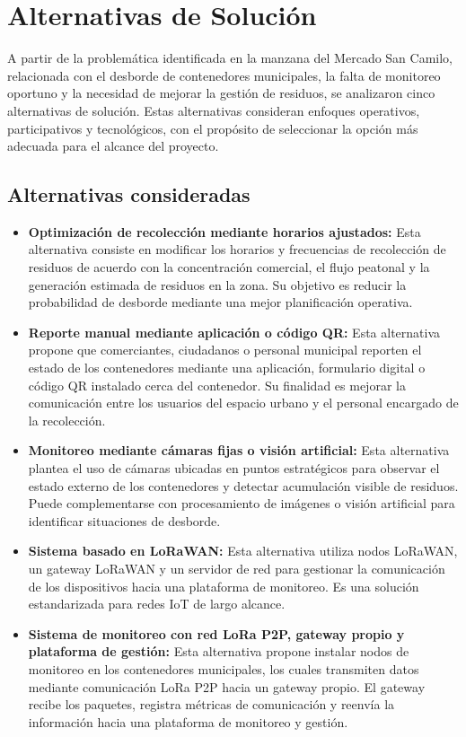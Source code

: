 \section{Alternativas de Solución}

A partir de la problemática identificada en la manzana del Mercado San Camilo, relacionada con el desborde de contenedores municipales, la falta de monitoreo oportuno y la necesidad de mejorar la gestión de residuos, se analizaron cinco alternativas de solución. Estas alternativas consideran enfoques operativos, participativos y tecnológicos, con el propósito de seleccionar la opción más adecuada para el alcance del proyecto.

\subsection{Alternativas consideradas}

\begin{itemize}
    \item \textbf{Optimización de recolección mediante horarios ajustados:} Esta alternativa consiste en modificar los horarios y frecuencias de recolección de residuos de acuerdo con la concentración comercial, el flujo peatonal y la generación estimada de residuos en la zona. Su objetivo es reducir la probabilidad de desborde mediante una mejor planificación operativa.
    
    \item \textbf{Reporte manual mediante aplicación o código QR:} Esta alternativa propone que comerciantes, ciudadanos o personal municipal reporten el estado de los contenedores mediante una aplicación, formulario digital o código QR instalado cerca del contenedor. Su finalidad es mejorar la comunicación entre los usuarios del espacio urbano y el personal encargado de la recolección.
    
    \item \textbf{Monitoreo mediante cámaras fijas o visión artificial:} Esta alternativa plantea el uso de cámaras ubicadas en puntos estratégicos para observar el estado externo de los contenedores y detectar acumulación visible de residuos. Puede complementarse con procesamiento de imágenes o visión artificial para identificar situaciones de desborde.
    
    \item \textbf{Sistema basado en LoRaWAN:} Esta alternativa utiliza nodos LoRaWAN, un gateway LoRaWAN y un servidor de red para gestionar la comunicación de los dispositivos hacia una plataforma de monitoreo. Es una solución estandarizada para redes IoT de largo alcance.
    
    \item \textbf{Sistema de monitoreo con red LoRa P2P, gateway propio y plataforma de gestión:} Esta alternativa propone instalar nodos de monitoreo en los contenedores municipales, los cuales transmiten datos mediante comunicación LoRa P2P hacia un gateway propio. El gateway recibe los paquetes, registra métricas de comunicación y reenvía la información hacia una plataforma de monitoreo y gestión.
\end{itemize}

